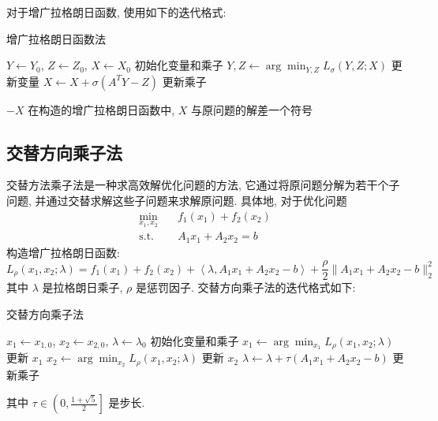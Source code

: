 \documentclass{article}
\begin{document}
对于增广拉格朗日函数, 使用如下的迭代格式:

\begin{algorithm}
    \caption{增广拉格朗日函数法}
    \begin{algorithmic}
        \State $Y \gets Y_0$, $Z \gets Z_0$, $X \gets X_0$ \Comment 初始化变量和乘子
        \State $Y, Z \gets \arg \min_{Y,Z} L_\sigma(Y,Z;X)$ \Comment 更新变量
        \State $X \gets X + \sigma(A^T Y -Z)$ \Comment 更新乘子
        \EndWhile
    \end{algorithmic}
    \Return $-X$ \Comment 在构造的增广拉格朗日函数中, $X$ 与原问题的解差一个符号
\end{algorithm}

\subsection{交替方向乘子法}

交替方法乘子法是一种求高效解优化问题的方法, 它通过将原问题分解为若干个子问题, 并通过交替求解这些子问题来求解原问题. 具体地, 对于优化问题
\begin{equation*}
    \begin{aligned}
        \min_{x_1, x_2}\quad & f_1(x_1) + f_2(x_2)\\
        \text{s.t.}\quad & A_1 x_1 + A_2 x_2 = b
    \end{aligned}
\end{equation*}
构造增广拉格朗日函数:
\begin{equation*}
    L_\rho(x_1, x_2; \lambda) = f_1(x_1) + f_2(x_2) + \left<\lambda, A_1 x_1 + A_2 x_2 - b\right> + \frac{\rho}{2}\|A_1 x_1 + A_2 x_2 - b\|_2^2
\end{equation*}
其中 $\lambda$ 是拉格朗日乘子, $\rho$ 是惩罚因子. 交替方向乘子法的迭代格式如下:
\begin{algorithm}
    \caption{交替方向乘子法}
    \begin{algorithmic}
        \State $x_1 \gets x_{1,0}$, $x_2 \gets x_{2,0}$, $\lambda \gets \lambda_0$ \Comment 初始化变量和乘子
        \State $x_1 \gets \arg \min_{x_1} L_\rho(x_1,x_2;\lambda)$ \Comment 更新 $x_1$
        \State $x_2 \gets \arg \min_{x_2} L_\rho(x_1,x_2;\lambda)
        $ \Comment 更新 $x_2$
        \State $\lambda \gets \lambda + \tau(A_1 x_1 + A_2 x_2 - b)$ \Comment 更新乘子
        \EndWhile
    \end{algorithmic}
\end{algorithm}
\newline
其中 $\tau\in \left(0,\frac{1+\sqrt{5}}{2}\right]$ 是步长.
\end{document}
